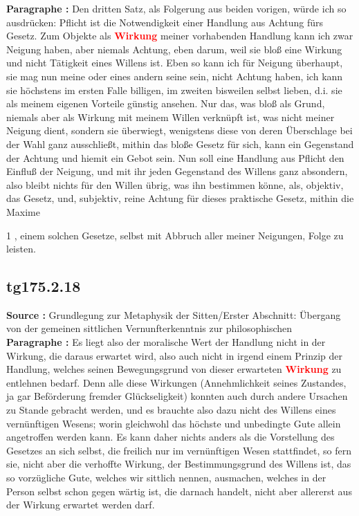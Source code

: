 \documentclass[a4paper,12pt,twoside]{book}
\newcommand{\match}[1]{\textcolor{red}{\textbf{#1}}}
\begin{document}
	\noindent\textbf{Paragraphe : }Den dritten Satz, als Folgerung aus beiden vorigen, würde ich so ausdrücken: Pflicht ist die Notwendigkeit einer Handlung aus Achtung fürs Gesetz. Zum Objekte als \match{Wirkung} meiner vorhabenden Handlung kann ich zwar Neigung haben, aber niemals Achtung, eben darum, weil sie bloß eine Wirkung und nicht Tätigkeit eines Willens ist. Eben so kann ich für Neigung überhaupt, sie mag nun meine oder eines andern seine sein, nicht Achtung haben, ich kann sie höchstens im ersten Falle billigen, im zweiten bisweilen selbst lieben, d.i. sie als meinem eigenen  Vorteile günstig ansehen. Nur das, was bloß als Grund, niemals aber als Wirkung mit meinem Willen verknüpft ist, was nicht meiner Neigung dient, sondern sie überwiegt, wenigstens diese von deren Überschlage bei der Wahl ganz ausschließt, mithin das bloße Gesetz für sich, kann ein Gegenstand der Achtung und hiemit ein Gebot sein. Nun soll eine Handlung aus Pflicht den Einfluß der Neigung, und mit ihr jeden Gegenstand des Willens ganz absondern, also bleibt nichts für den Willen übrig, was ihn bestimmen könne, als, objektiv, das Gesetz, und, subjektiv, reine Achtung für dieses praktische Gesetz, mithin die Maxime
	
	
	1
	, einem solchen Gesetze, selbst mit Abbruch aller meiner Neigungen, Folge zu leisten. 
	
	\subsection*{tg175.2.18} 
	\textbf{Source : }Grundlegung zur Metaphysik der Sitten/Erster Abschnitt: Übergang von der gemeinen sittlichen Vernunfterkenntnis zur philosophischen\\  
	
	\noindent\textbf{Paragraphe : }Es liegt also der moralische Wert der Handlung nicht in der Wirkung, die daraus erwartet wird, also auch nicht in irgend einem Prinzip der Handlung, welches seinen Bewegungsgrund von dieser erwarteten \match{Wirkung} zu entlehnen bedarf. Denn alle diese Wirkungen (Annehmlichkeit seines Zustandes, ja gar Beförderung fremder Glückseligkeit) konnten auch durch andere Ursachen zu Stande gebracht werden, und es brauchte also dazu nicht des Willens eines vernünftigen Wesens; worin gleichwohl das höchste und unbedingte Gute allein angetroffen werden kann. Es kann daher nichts anders als die Vorstellung des Gesetzes an sich selbst, die freilich nur im vernünftigen Wesen stattfindet, so fern sie, nicht aber die verhoffte Wirkung, der Bestimmungsgrund des Willens ist, das so vorzügliche Gute, welches wir sittlich nennen, ausmachen, welches in der Person selbst schon gegen wärtig ist, die darnach handelt, nicht aber allererst aus der Wirkung erwartet werden darf.
	
\end{document}

